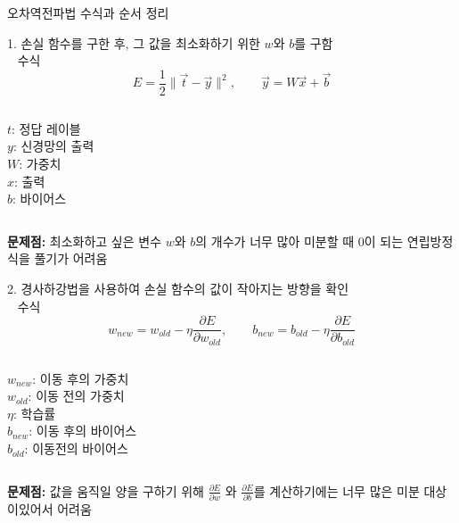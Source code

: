 \documentclass[10pt,t]{beamer}
\begin{document}
\begin{frame} {오차역전파법 수식과 순서 정리}
    \begin{alertblock}{1. 손실 함수를 구한 후, 그 값을 최소화하기 위한 $w$와 $b$를 구함\\~}
        수식\\
        \[E= \frac{1}{2}\| \vec{t}- \vec{y}\|^2, \qquad \vec{y} = W\vec{x}+\vec{b}\]
        \begin{columns}
            $t$: 정답 레이블\\
            $y$: 신경망의 출력\\
            $W$: 가중치\\
            $x$: 출력\\
            $b$: 바이어스\\
        \end{columns}
        \vspace{1em}

        \textbf{문제점:} 최소화하고 싶은 변수 $w$와 $b$의 개수가 너무 많아 미분할 때 0이 되는 연립방정식을 풀기가 어려움
    \end{alertblock}

    \pagebreak
    \begin{alertblock}{2. 경사하강법을 사용하여 손실 함수의 값이 작아지는 방향을 확인\\~}
        수식\\
        \[w_{new} = w_{old} -\eta\frac{\partial E}{\partial w_{old}} ,\qquad b_{new} = b_{old}-\eta \frac{\partial E}{\partial b_{old}}\]
        \begin{columns}
            $w_{new}$: 이동 후의 가중치\\
            $w_{old}$: 이동 전의 가중치\\
            $\eta$: 학습률\\
            $b_{new}$: 이동 후의 바이어스\\
            $b_{old}$: 이동전의 바이어스\\
        \end{columns}

        \vspace{1em}
        \textbf{문제점:} 값을 움직일 양을 구하기 위해 $\frac{\partial E}{\partial w}$ 와 $\frac{\partial E}{\partial b}$를 계산하기에는 너무 많은 미분 대상이있어서 어려움
    \end{alertblock}


\end{frame}
\end{document}
